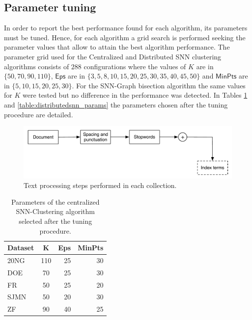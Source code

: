 \documentclass[a4paper]{article}
\begin{document}
\subsection*{Parameter tuning}
In order to report the best performance found for each algorithm, its parameters must be tuned.
Hence, for each algorithm a grid search is performed seeking the parameter values that allow to attain the best algorithm performance. The parameter grid used for the Centralized and Distributed SNN clustering algorithms consists of $288$ configurations where the values of $K$ are in $\{50, 70, 90, 110\}$, $\mathsf{Eps}$ are in $\{3, 5, 8, 10, 15, 20, 25, 30, 35, 40, 45, 50\}$ and $\mathsf{MinPts}$ are in $\{5, 10, 15, 20, 25, 30\}$. For the SNN-Graph bisection algorithm the same values for $K$ were tested but no difference in the performance was detected. In Tables \ref{table:centralizedsnn_params} and \ref{table:distributedsnn_params} the parameters chosen  after the tuning procedure are detailed.

\begin{figure}[!htbp]
\centering
  \includegraphics[scale=0.7]
  {text_processing_steps.pdf}
  \caption{Text processing steps performed in each collection.}
  \label{fig:text_processing}
\end{figure}


\begin{table}[!htbp]
\centering
\begin{tabular}{l|crr}
\textbf{Dataset} & \textbf{K} & \textbf{Eps} & \textbf{MinPts} \\ \hline
20NG    & 110& 25 & 30 \\
DOE     &  70& 25 & 30 \\
FR      &  50& 25 & 20  \\
SJMN    &  50& 20 & 30 \\
ZF      &  90& 40 & 25 \\ \hline
\end{tabular}
\caption{Parameters of the centralized SNN-Clustering algorithm selected after the tuning procedure.}
\label{table:centralizedsnn_params}
\end{table}
\end{document}
